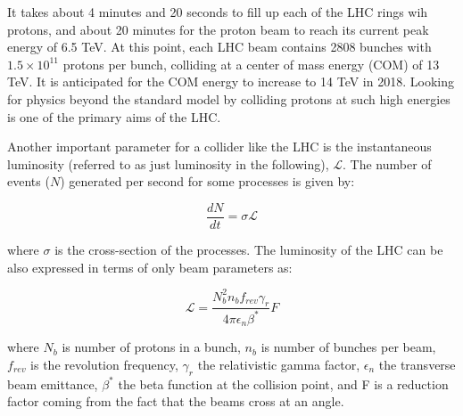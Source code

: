 

It takes about 4 minutes and 20 seconds to fill up each of the LHC rings wih protons, and about 20 minutes for the proton beam to reach its current peak energy of 6.5 TeV. At this point, each LHC beam contains 2808 bunches with $1.5 \times 10^{11}$ protons per bunch, colliding at a center of mass energy (COM) of 13 TeV. It is anticipated for the COM energy to increase to 14 TeV in 2018. Looking for physics beyond the standard model by colliding protons at such high energies is one of the primary aims of the LHC.

Another important parameter for a collider like the LHC is the instantaneous luminosity (referred to as just luminosity in the following), $\mathscr{L}$. The number of events ($N$) generated per second for some processes is given by:

\begin{equation}
  \frac{dN}{dt}=\sigma\mathscr{L}
\end{equation}


where $\sigma$ is the cross-section of the processes. The luminosity of the LHC can be also expressed in terms of only beam parameters as:

\begin{equation}
  \mathscr{L}=\frac{N_{b}^2 n_{b} f_{rev} \gamma_{r}}{4 \pi \epsilon_{n}\beta^{*}} F
\end{equation}

where $N_{b}$ is number of protons in a bunch, $n_{b}$ is number of bunches per beam, $f_{rev}$ is the revolution frequency, $\gamma_{r}$ the relativistic gamma factor, $\epsilon_{n}$ the transverse beam emittance, $\beta^{*}$ the beta function at the collision point, and F is a reduction factor coming from the fact that the beams cross at an angle.


